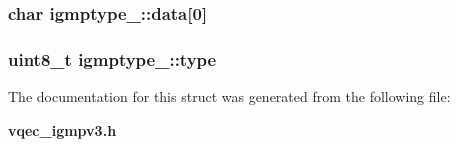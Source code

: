 \subsubsection{\setlength{\rightskip}{0pt plus 5cm}char \bf{igmptype\_\-::data}[0]}\label{structigmptype___999a287204a33818d66a37625047cf99}


\subsubsection{\setlength{\rightskip}{0pt plus 5cm}uint8\_\-t \bf{igmptype\_\-::type}}\label{structigmptype___e3060448f8d590f591713061882fd058}




The documentation for this struct was generated from the following file:\begin{CompactItemize}
\item 
\bf{vqec\_\-igmpv3.h}\end{CompactItemize}
